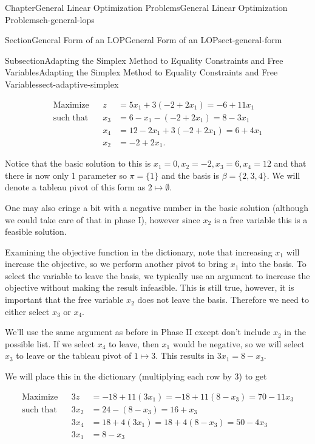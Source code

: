 \documentclass[oneside,10pt,]{book}
\numberwithin{equation}{section}
\newcommand{\amp}{&}
\begin{document}
\begin{chapterptx}{Chapter}{General Linear Optimization Problems}{}{General Linear Optimization Problems}{}{}{ch-general-lops}
\begin{sectionptx}{Section}{General Form of an LOP}{}{General Form of an LOP}{}{}{sect-general-form}
\begin{subsectionptx}{Subsection}{Adapting the Simplex Method to Equality Constraints and Free Variables}{}{Adapting the Simplex Method to Equality Constraints and Free Variables}{}{}{sect-adaptive-simplex}
\par
%
\begin{equation}
\begin{aligned} \text{Maximize} \amp \amp z \amp = 5x_1 + 3(-2+2x_1) = -6 + 11 x_1 \\ \text{such that} \amp \amp x_3 \amp = 6 - x_1 - (-2 +2x_1) = 8 - 3x_1 \\ \amp \amp x_4 \amp = 12 - 2x_1 + 3(-2 + 2x_1) = 6 + 4x_1 \\ \amp \amp x_2  \amp = -2 + 2 x_1.
\end{aligned}\label{eq-gen-dict-01}
\end{equation}
%
\par
Notice that the basic solution to this is \(x_1 = 0, x_2 = -2, x_3 = 6, x_4 = 12\) and that there is now only 1 parameter so \(\pi = \{1\}\) and the basis is \(\beta = \{2,3,4\}\). We will denote a tableau pivot of this form as \(2 \mapsto \emptyset\).%
\par
One may also cringe a bit with a negative number in the basic solution (although we could take care of that in phase I), however since \(x_2\) is a free variable this is a feasible solution.%
\par
Examining the objective function in the dictionary, note that increasing \(x_1\) will increase the objective, so we perform another pivot to bring \(x_1\) into the basis. To select the variable to leave the basis, we typically use an argument to increase the objective without making the result infeasible. This is still true, however, it is important that the free variable \(x_2\) does not leave the basis. Therefore we need to either select \(x_3\) or \(x_4\).%
\par
We'll use the same argument as before in Phase II except don't include \(x_2\) in the possible list. If we select \(x_4\) to leave, then \(x_1\) would be negative, so we will select \(x_3\) to leave or the tableau pivot of \(1 \mapsto 3\). This results in \(3x_1 = 8- x_3\).%
\par
We will place this in the dictionary (multiplying each row by 3) to get%
\par
%
\begin{equation*}
\begin{aligned} \text{Maximize} \amp \amp 3z \amp = -18 + 11 (3x_1) = - 18 + 11(8-x_3) = 70 - 11 x_3 \\ \text{such that} \amp \amp 3x_2 \amp = 24 - (8-x_3) = 16 + x_3 \\ \amp \amp 3x_4 \amp = 18 + 4 (3x_1) = 18 + 4 (8-x_3) = 50 - 4 x_3  \\ \amp \amp 3x_1 \amp = 8 - x_3 \end{aligned}

\end{equation*}
\end{subsectionptx}
\end{sectionptx}
\end{chapterptx}
\end{document}
